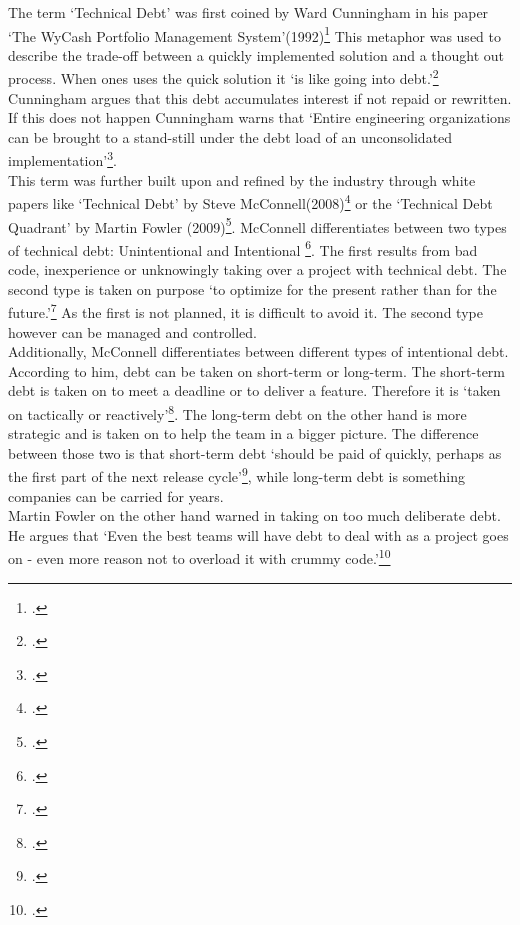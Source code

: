 The term `Technical Debt' was first coined by Ward Cunningham in his paper `The WyCash Portfolio Management System'(1992)\footcite{cunninghamWyCashPortfolioManagement1992} This metaphor was used to describe the trade-off between a quickly implemented solution and a thought out process. 
When ones uses the quick solution it `is like going into debt.'\footcite[2]{cunninghamWyCashPortfolioManagement1992} Cunningham argues that this debt accumulates interest if not repaid or rewritten. 
If this does not happen Cunningham warns that `Entire engineering organizations can be brought to a stand-still under the debt load of an unconsolidated implementation'\footcite[2]{cunninghamWyCashPortfolioManagement1992}.\\

This term was further built upon and refined by the industry through white papers like `Technical Debt' by Steve McConnell(2008)\footcite{mcconnellManagingTechnicalDebt2017} or the `Technical Debt Quadrant' by Martin Fowler (2009)\footcite{fowlerTechnicalDebtQuadrant2009}.
McConnell differentiates between two types of technical debt: Unintentional and Intentional \footcite[3]{mcconnellManagingTechnicalDebt2017}. The first results from bad code, inexperience or unknowingly taking over a project with technical debt.
The second type is taken on purpose `to optimize for the present rather than for the future.'\footcite[3]{mcconnellManagingTechnicalDebt2017} As the first is not planned, it is difficult to avoid it. The second type however can be managed and controlled.\\
Additionally, McConnell differentiates between different types of intentional debt. According to him, debt can be taken on short-term or long-term. The short-term debt is taken on to meet a deadline or to deliver a feature. Therefore it is `taken on tactically or reactively'\footcite[3]{mcconnellManagingTechnicalDebt2017}.
The long-term debt on the other hand is more strategic and is taken on to help the team in a bigger picture. The difference between those two is that short-term debt `should be paid of quickly, perhaps as the first part of the next release cycle'\footcite[4]{mcconnellManagingTechnicalDebt2017}, while 
long-term debt is something companies can be carried for years.\\
Martin Fowler on the other hand warned in taking on too much deliberate debt. He argues that `Even the best teams will have debt to deal with as a project goes on - even more reason not to overload it with crummy code.'\footcite{fowlerTechnicalDebtQuadrant2009}
